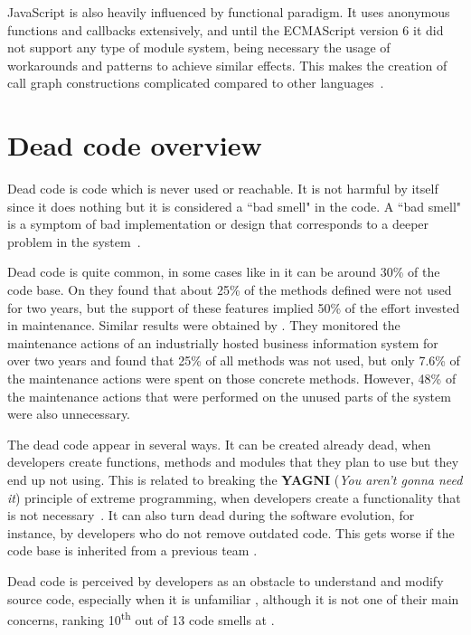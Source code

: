 \documentclass{uvamscse}
\begin{document}
JavaScript is also heavily influenced by functional paradigm. It uses anonymous functions and callbacks extensively, and until the ECMAScript version 6 it did not support any type of module system, being necessary the usage of workarounds and patterns to achieve similar effects. This makes the creation of call graph constructions complicated compared to other languages~\cite{SunKwangwon2017AoJP}.

\section{Dead code overview}
Dead code is code which is never used or reachable. It is not harmful by itself since it does nothing but it is considered a ``bad smell" in the code. A ``bad smell" is a symptom of bad implementation or design that corresponds to a deeper problem in the system~\cite{FowlerSmells}.

Dead code is quite common, in some cases like in \cite{DeadCodePHP} it can be around 30\% of the code base. On \cite{ICSE-2012-EderJJHVP} they found that about 25\% of the methods defined were not used for two years, but the support of these features implied 50\% of the effort invested in maintenance. Similar results were obtained by \cite{ICSE-2012-EderJJHVP}. They monitored the maintenance actions of an industrially hosted business information system for over two years and found that 25\% of all methods was not used, but only 7.6\% of the maintenance actions were spent on those concrete methods. However, 48\% of the maintenance actions that were performed on the unused parts of the system were also unnecessary.

The dead code appear in several ways. It can be created already dead, when developers create functions, methods and modules that they plan to use but they end up not using. This is related to breaking the \textbf{YAGNI} (\textit{You aren't gonna need it}) principle of extreme programming, when developers create a functionality that is not necessary~\cite{RonJeffriesXP}. It can also turn dead during the software evolution, for instance, by developers who do not remove outdated code. This gets worse if the code base is inherited from a previous team \cite{MultistudyDeadCode}.

Dead code is perceived by developers as an obstacle to understand and modify source code, especially when it is unfamiliar \cite{MultistudyDeadCode}, although it is not one of their main concerns, ranking 10\textsuperscript{th} out of 13 code smells at \cite{6671299}.
\end{document}
